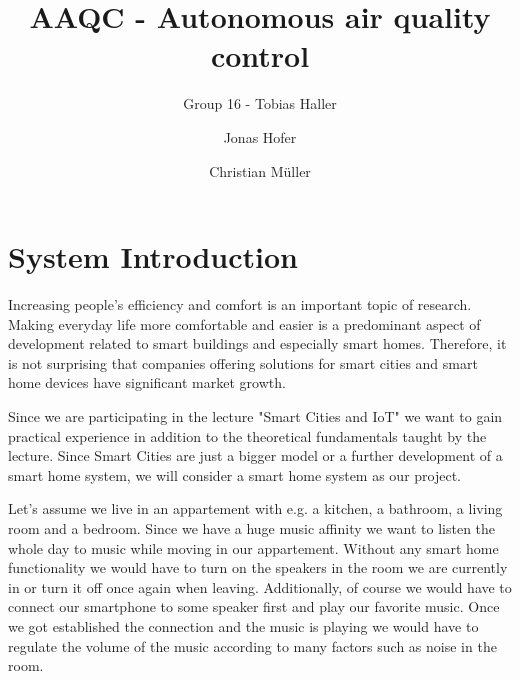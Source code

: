\documentclass[runningheads]{llncs}
\begin{document}
%
    \title{AAQC - Autonomous air quality control}


    \author{Group 16 - Tobias Haller \and Jonas Hofer \and Christian M\"uller}


%
    \maketitle              %
%
%    


    \section{System Introduction}

    Increasing people's efficiency and comfort is an important topic of research.
    Making everyday life more comfortable and easier is a predominant aspect of development related to smart buildings and especially smart homes.
    Therefore, it is not surprising that companies offering solutions for smart cities and smart home devices have significant market growth.

    Since we are participating in the lecture "Smart Cities and IoT" we want to gain practical experience in addition to the theoretical fundamentals taught by the lecture.
    Since Smart Cities are just a bigger model or a further development of a smart home system, we will consider a smart home system as our project.

    Let's assume we live in an appartement with e.g. a kitchen, a bathroom, a living room and a bedroom.
    Since we have a huge music affinity we want to listen the whole day to music while moving in our appartement.
    Without any smart home functionality we would have to turn on the speakers in the room we are currently in or turn it off once again when leaving.
    Additionally, of course we would have to connect our smartphone to some speaker first and play our favorite music.
    Once we got established the connection and the music is playing we would have to regulate the volume of the music according to many factors such as noise in the room.
\end{document}
